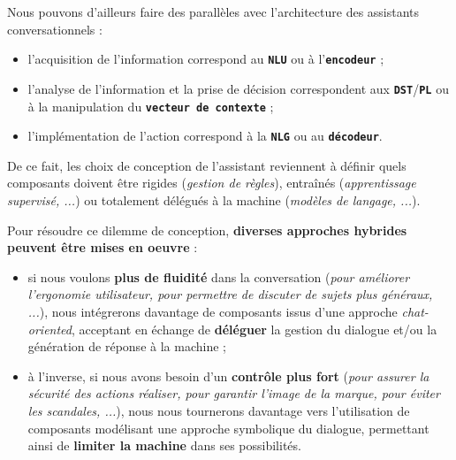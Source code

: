 \begin{leftBarAuthorOpinion}
			Nous pouvons d'ailleurs faire des parallèles avec l'architecture des assistants conversationnels :
			\begin{itemize}
				\item l'acquisition de l'information correspond au \textcolor{colorCarrotOrange}{\textbf{\texttt{NLU}}} ou à l'\textcolor{colorCarrotOrange}{\textbf{\texttt{encodeur}}} ;
				\item l'analyse de l'information et la prise de décision correspondent aux \textcolor{colorDarkPastelGreen}{\textbf{\texttt{DST}}}/\textcolor{colorDarkPastelGreen}{\textbf{\texttt{PL}}} ou à la manipulation du \textcolor{colorDarkPastelGreen}{\textbf{\texttt{vecteur de contexte}}} ;
				\item l'implémentation de l'action correspond à la \textcolor{colorSilverLakeBlue}{\textbf{\texttt{NLG}}} ou au \textcolor{colorSilverLakeBlue}{\textbf{\texttt{décodeur}}}.
			\end{itemize}
			De ce fait, les choix de conception de l'assistant reviennent à définir quels composants doivent être rigides (\textit{gestion de règles}), entraînés (\textit{apprentissage supervisé, ...}) ou totalement délégués à la machine (\textit{modèles de langage, ...}).
		\end{leftBarAuthorOpinion}
		
		\newpage
		Pour résoudre ce dilemme de conception, \textbf{diverses approches hybrides peuvent être mises en oeuvre} :
		\begin{itemize}
			\item si nous voulons \textbf{plus de fluidité} dans la conversation (\textit{pour améliorer l'ergonomie utilisateur, pour permettre de discuter de sujets plus généraux, ...}), nous intégrerons davantage de composants issus d'une approche \textit{chat-oriented}, acceptant en échange de \textbf{déléguer} la gestion du dialogue et/ou la génération de réponse à la machine ;
			\item à l'inverse, si nous avons besoin d'un \textbf{contrôle plus fort} (\textit{pour assurer la sécurité des actions réaliser, pour garantir l'image de la marque, pour éviter les scandales, ...}), nous nous tournerons davantage vers l'utilisation de composants modélisant une approche symbolique du dialogue, permettant ainsi de \textbf{limiter la machine} dans ses possibilités.
		\end{itemize}
			
